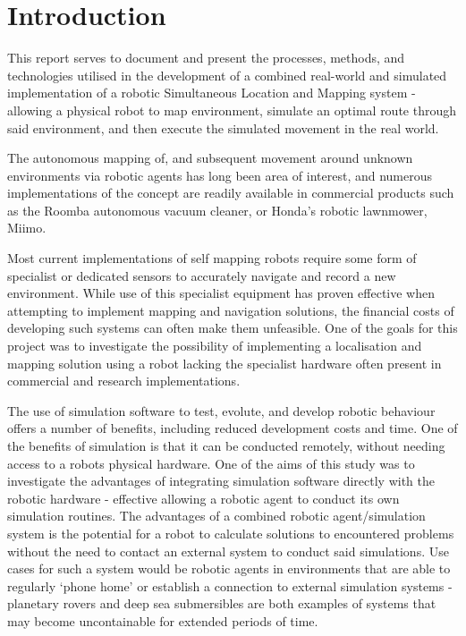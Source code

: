 \pagestyle{fancy}
\section{Introduction} \label{sec_introduction}
This report serves to document and present the processes, methods, and
technologies utilised in the development of a combined real-world and
simulated implementation of a robotic Simultaneous Location and Mapping
system - allowing a physical robot to map environment, simulate an optimal
route through said environment, and then execute the simulated movement in the
real world.

The autonomous mapping of, and subsequent movement around unknown environments
via robotic agents has long been area of interest, and numerous
implementations of the concept are readily available in commercial products
such as the Roomba autonomous vacuum cleaner, or Honda's robotic lawnmower,
Miimo.

Most current implementations of self mapping robots require some form of
specialist or dedicated sensors to accurately navigate and record a new
environment.
While use of this specialist equipment has proven effective when attempting
to implement  mapping and navigation solutions, the financial costs of
developing such systems can often make them unfeasible.
One of the goals for this project was to investigate the possibility of
implementing a localisation and mapping solution using a robot lacking
the specialist hardware often present in commercial and research
implementations.

The use of simulation software to test, evolute, and develop robotic behaviour
offers a number of benefits, including reduced development costs and time.
One of the benefits of simulation is that it can be conducted remotely, without
needing access to a robots physical hardware.
One of the aims of this study was to investigate the advantages of integrating
simulation software directly with the robotic hardware - effective allowing a
robotic agent to conduct its own simulation routines.
The advantages of a combined robotic agent/simulation system is the potential
for a robot to calculate solutions to encountered problems without the need to
contact an external system to conduct said simulations.
Use cases for such a system would be robotic agents in environments that are
able to regularly `phone home' or establish a connection to  external
simulation systems - planetary rovers and deep sea submersibles  are both
examples of systems that may become uncontainable for extended periods of time.


